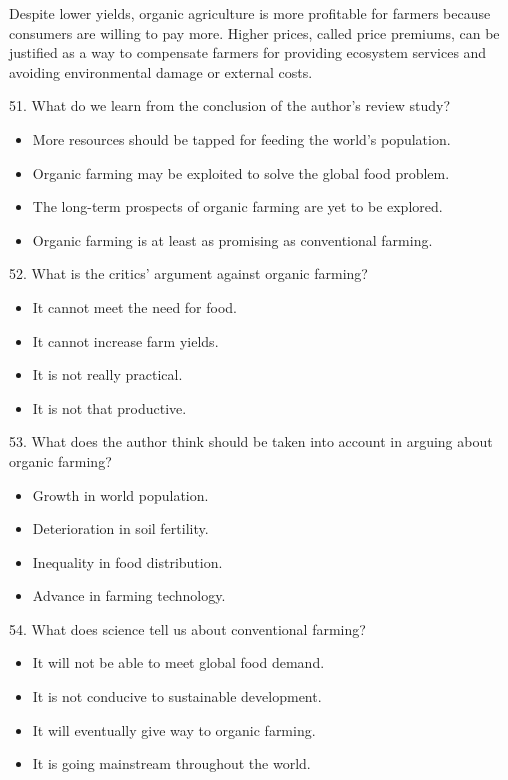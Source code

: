 \documentclass[UTF8,11pt]{ctexart}
\begin{document}
Despite lower yields, organic agriculture is more profitable for farmers because consumers are willing to pay more. Higher prices, called price premiums, can be justified as a way to compensate farmers for providing ecosystem services and avoiding environmental damage or external costs.


51. What do we learn from the conclusion of the author's review study?


\begin{itemize}[leftmargin=2em,itemsep=.2em,topsep=.4em]\item[A.] More resources should be tapped for feeding the world's population.
\item[B.] Organic farming may be exploited to solve the global food problem.
\item[C.] The long-term prospects of organic farming are yet to be explored.
\item[D.] Organic farming is at least as promising as conventional farming.
\end{itemize}

52. What is the critics' argument against organic farming?


\begin{itemize}[leftmargin=2em,itemsep=.2em,topsep=.4em]\item[A.] It cannot meet the need for food.
\item[B.] It cannot increase farm yields.
\item[C.] It is not really practical.
\item[D.] It is not that productive.
\end{itemize}

53. What does the author think should be taken into account in arguing about organic farming?


\begin{itemize}[leftmargin=2em,itemsep=.2em,topsep=.4em]\item[A.] Growth in world population.
\item[B.] Deterioration in soil fertility.
\item[C.] Inequality in food distribution.
\item[D.] Advance in farming technology.
\end{itemize}

54. What does science tell us about conventional farming?


\begin{itemize}[leftmargin=2em,itemsep=.2em,topsep=.4em]\item[A.] It will not be able to meet global food demand.
\item[B.] It is not conducive to sustainable development.
\item[C.] It will eventually give way to organic farming.
\item[D.] It is going mainstream throughout the world.
\end{itemize}
\end{document}

